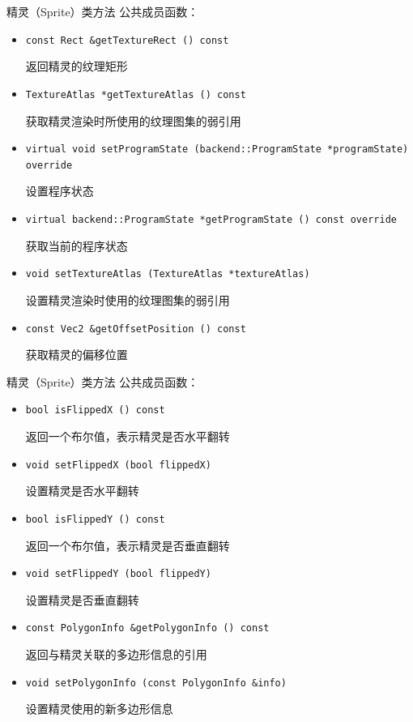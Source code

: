 \documentclass{beamer}
\begin{document}
\begin{frame}[fragile]{精灵（Sprite）类方法}
公共成员函数：
\begin{itemize}
\item \texttt{const Rect \&getTextureRect () const}

返回精灵的纹理矩形
\item \texttt{TextureAtlas *getTextureAtlas () const}

获取精灵渲染时所使用的纹理图集的弱引用
\item \texttt{virtual void setProgramState (backend::ProgramState *programState) override}

设置程序状态
\item \texttt{virtual backend::ProgramState *getProgramState () const override}

获取当前的程序状态
\item \texttt{void setTextureAtlas (TextureAtlas *textureAtlas)}

设置精灵渲染时使用的纹理图集的弱引用
\item \texttt{const Vec2 \&getOffsetPosition () const}

获取精灵的偏移位置
\end{itemize}
\end{frame}


\begin{frame}[fragile]{精灵（Sprite）类方法}
公共成员函数：
\begin{itemize}
\item \texttt{bool isFlippedX () const}

返回一个布尔值，表示精灵是否水平翻转
\item \texttt{void setFlippedX (bool flippedX)}

设置精灵是否水平翻转
\item \texttt{bool isFlippedY () const}

返回一个布尔值，表示精灵是否垂直翻转
\item \texttt{void setFlippedY (bool flippedY)}

设置精灵是否垂直翻转
\item \texttt{const PolygonInfo \&getPolygonInfo () const}

返回与精灵关联的多边形信息的引用
\item \texttt{void setPolygonInfo (const PolygonInfo \&info)}

设置精灵使用的新多边形信息
\end{itemize}
\end{frame}
\end{document}
